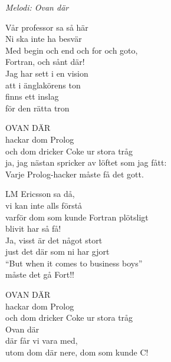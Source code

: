 {\footnotesize\textit{Melodi: Ovan där}}\par
\vspace{8pt}
Vår professor sa så här\\
Ni ska inte ha besvär\\
Med begin och end och for och goto,\\
Fortran, och sånt där!\\
Jag har sett i en vision\\
att i änglakörens ton\\
finns ett inslag\\
för den rätta tron\par
\vspace{7pt}
OVAN DÄR\\
hackar dom Prolog\\
och dom dricker Coke ur stora tråg\\
ja, jag nästan spricker av löftet som jag fått:\\
Varje Prolog-hacker måste få det gott.\par
\vspace{7pt}
LM Ericsson sa då,\\
vi kan inte alls förstå\\
varför dom som kunde Fortran plötsligt\\
blivit har så få!\\
Ja, visst är det något stort\\
just det där som ni har gjort\\
``But when it comes to business boys''\\
måste det gå Fort!!\par
\vspace{7pt}
OVAN DÄR\\
hackar dom Prolog\\
och dom dricker Coke ur stora tråg\\
Ovan där\\
där får vi vara med,\\
utom dom där nere, dom som kunde C!

